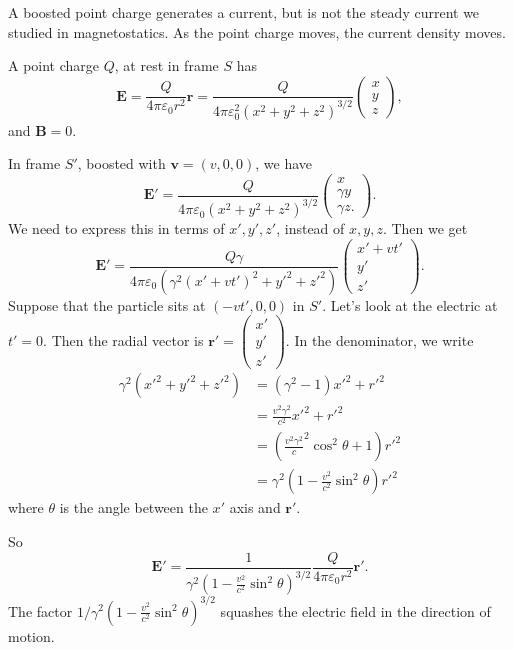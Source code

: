 \documentclass[a4paper]{article}
\begin{document}
\begin{eg}
  A boosted point charge generates a current, but is not the steady current we studied in magnetostatics. As the point charge moves, the current density moves.

  A point charge $Q$, at rest in frame $S$ has
  \[
    \mathbf{E} = \frac{Q}{4\pi \varepsilon_0 r^2}\hat{\mathbf{r}} = \frac{Q}{4\pi \varepsilon_0^2(x^2 + y^2 + z^2)^{3/2}}
    \begin{pmatrix}
      x\\y\\z
    \end{pmatrix},
  \]
  and $\mathbf{B} = 0$.

  In frame $S'$, boosted with $\mathbf{v} = (v, 0, 0)$, we have
  \[
    \mathbf{E}' = \frac{Q}{4\pi \varepsilon_0(x^2 + y^2 + z^2)^{3/2}}
    \begin{pmatrix}
      x\\ \gamma y\\ \gamma z.
    \end{pmatrix}.
  \]
  We need to express this in terms of $x', y', z'$, instead of $x, y, z$. Then we get
  \[
    \mathbf{E}' = \frac{Q\gamma}{4\pi \varepsilon_0 (\gamma^2(x' + vt')^2 + y'^2 + z'^2)}
    \begin{pmatrix}
      x' + vt'\\y'\\z'
    \end{pmatrix}.
  \]
  Suppose that the particle sits at $(-vt', 0, 0)$ in $S'$. Let's look at the electric at $t'=0$. Then the radial vector is $\mathbf{r}' =
  \begin{pmatrix}
    x'\\y'\\z'
  \end{pmatrix}.
  $
  In the denominator, we write
  \begin{align*}
    \gamma^2(x'^2 + y'^2 + z'^2) &= (\gamma^2 - 1)x'^2 + r'^2\\
    &= \frac{v^2\gamma^2}{c^2}x'^2 + r'^2\\
    &= \left(\frac{v^2\gamma^2}c^2 \cos^2 \theta + 1\right)r'^2\\
    &= \gamma^2\left(1 - \frac{v^2}{c^2}\sin^2 \theta\right)r'^2
  \end{align*}
  where $\theta$ is the angle between the $x'$ axis and $\mathbf{r}'$.

  So
  \[
    \mathbf{E}' = \frac{1}{\gamma^2\left(1 - \frac{v^2}{c^2}\sin^2 \theta\right)^{3/2}}\frac{Q}{4\pi \varepsilon_0 r^2}\hat{\mathbf{r}'}.
  \]
  The factor $1/\gamma^2\left(1 - \frac{v^2}{c^2}\sin^2 \theta\right)^{3/2}$ squashes the electric field in the direction of motion.


\end{eg}
\end{document}
